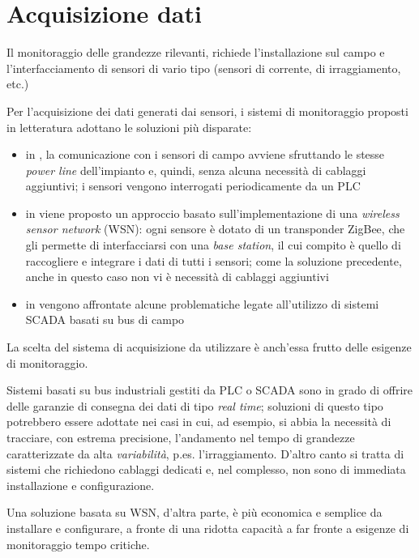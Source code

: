 \section{Acquisizione dati}
Il monitoraggio delle grandezze rilevanti, richiede l'installazione sul campo e 
l'interfacciamento di sensori di vario tipo (sensori di corrente, di irraggiamento, etc.)
%

%
Per l'acquisizione dei dati generati dai sensori, i sistemi di monitoraggio proposti in 
letteratura adottano le soluzioni pi\`u disparate:
%
\begin{itemize}
\item in \cite{roman06}, la comunicazione con i sensori di campo avviene sfruttando  
      le stesse \emph{power line} dell'impianto e, quindi, senza alcuna necessit\`a di 
      cablaggi aggiuntivi; i sensori vengono interrogati periodicamente da un PLC
\item in \cite{xiaoli11} viene proposto un approccio basato sull'implementazione di una 
      \emph{wireless sensor network} (WSN): ogni sensore \`e dotato di un transponder 
      ZigBee\cite{zigbee}, che gli permette di interfacciarsi con una \emph{base station},
      il cui compito \`e quello di raccogliere e integrare i dati di tutti i sensori;
      come la soluzione precedente, anche in questo caso non vi \`e necessit\`a di 
      cablaggi aggiuntivi
\item in \cite{guozhen09} vengono affrontate alcune problematiche legate 
      all'utilizzo di sistemi SCADA basati su bus di campo
\end{itemize}
%
La scelta del sistema di acquisizione da utilizzare \`e anch'essa frutto delle esigenze 
di monitoraggio. 
%

%
Sistemi basati su bus industriali gestiti da PLC o SCADA sono in grado di 
offrire delle garanzie di consegna dei dati di tipo \emph{real time}; 
%
soluzioni di questo tipo potrebbero essere adottate nei casi in cui, ad esempio, 
si abbia la necessit\`a di tracciare, con estrema precisione, l'andamento nel tempo 
di grandezze caratterizzate da alta \emph{variabilit\`a}, p.es. l'irraggiamento.
D'altro canto si tratta di sistemi che richiedono cablaggi dedicati e, nel complesso, 
non sono di immediata installazione e configurazione.
%

%
Una soluzione basata su WSN, d'altra parte, \`e pi\`u economica e semplice da 
installare e configurare, a fronte di una ridotta capacit\`a a far fronte a 
esigenze di monitoraggio tempo critiche.
%
